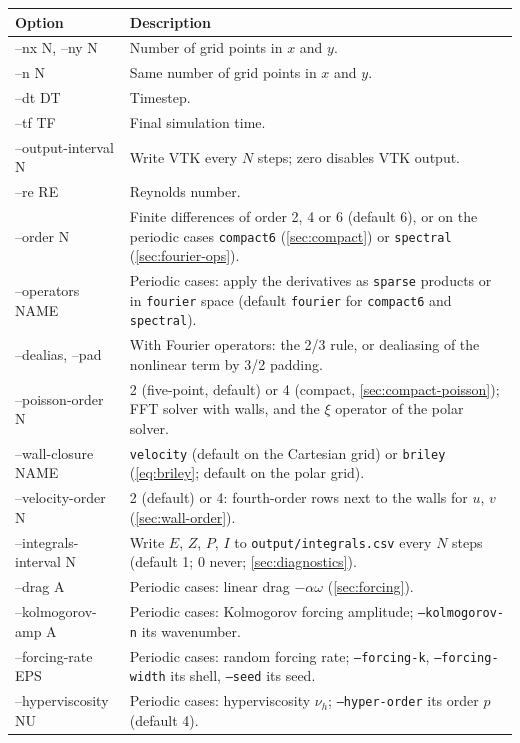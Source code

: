 \documentclass[11pt,a4paper]{article}
\begin{document}
\begin{longtable}{@{}>{\ttfamily}p{}p{}@{}}
\toprule
\normalfont Option & Description \\
\midrule
\endhead
--nx N, --ny N & Number of grid points in $x$ and $y$. \\
--n N & Same number of grid points in $x$ and $y$. \\
--dt DT & Timestep. \\
--tf TF & Final simulation time. \\
--output-interval N & Write VTK every $N$ steps; zero disables VTK output. \\
--re RE & Reynolds number. \\
--order N & Finite differences of order 2, 4 or 6 (default 6), or on the periodic cases \texttt{compact6} (\cref{sec:compact}) or \texttt{spectral} (\cref{sec:fourier-ops}). \\
--operators NAME & Periodic cases: apply the derivatives as \texttt{sparse} products or in \texttt{fourier} space (default \texttt{fourier} for \texttt{compact6} and \texttt{spectral}). \\
--dealias, --pad & With Fourier operators: the 2/3 rule, or dealiasing of the nonlinear term by 3/2 padding. \\
--poisson-order N & 2 (five-point, default) or 4 (compact, \cref{sec:compact-poisson}); FFT solver with walls, and the $\xi$ operator of the polar solver. \\
--wall-closure NAME & \texttt{velocity} (default on the Cartesian grid) or \texttt{briley} (\cref{eq:briley}; default on the polar grid). \\
--velocity-order N & 2 (default) or 4: fourth-order rows next to the walls for $u$, $v$ (\cref{sec:wall-order}). \\
--integrals-interval N & Write $E$, $Z$, $P$, $I$ to \texttt{output/integrals.csv} every $N$ steps (default 1; 0 never; \cref{sec:diagnostics}). \\
--drag A & Periodic cases: linear drag $-\alpha\omega$ (\cref{sec:forcing}). \\
--kolmogorov-amp A & Periodic cases: Kolmogorov forcing amplitude; \texttt{--kolmogorov-n} its wavenumber. \\
--forcing-rate EPS & Periodic cases: random forcing rate; \texttt{--forcing-k}, \texttt{--forcing-width} its shell, \texttt{--seed} its seed. \\
--hyperviscosity NU & Periodic cases: hyperviscosity $\nu_h$; \texttt{--hyper-order} its order $p$ (default 4). \\

\end{longtable}
\end{document}
